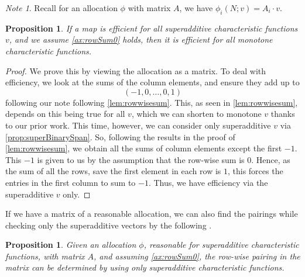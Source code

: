 \documentclass[12pt,letterpaper,final]{article}
\theoremstyle{plain}
\theoremstyle{plain}
\newtheorem{proposition}[theorem]{Proposition}
\theoremstyle{plain}
\theoremstyle{plain}
\theoremstyle{plain}
\theoremstyle{plain}
\theoremstyle{plain}
\theoremstyle{definition}
\theoremstyle{definition}
\theoremstyle{definition}
\theoremstyle{definition}
\theoremstyle{definition}
\theoremstyle{remark}
\theoremstyle{remark}
\newtheorem*{note}{Note}
\theoremstyle{remark}
\theoremstyle{remark}
\begin{document}
\begin{note}
  Recall for an allocation \(\phi\) with matrix \(A\), we have \(\phi_i(N;v)=A_i\cdot v\).
\end{note}

\begin{proposition}\label{prop:eff-superadd-monotone}
  If a map is efficient for all superadditive characteristic functions \(v\), and we
  assume \cref{ax:rowSum0} holds, then it is efficient for all
  monotone characteristic functions.
\end{proposition}

\begin{proof}
  We prove this by viewing the allocation as a matrix. To deal with
  efficiency, we 
  look at the sums of the column elements, and ensure they add up to
  \[
    {\left(
      -1,0,\ldots,0,1
    \right)}
  \]
  following our note following \cref{lem:rowwisesum}.
  This, as seen in \cref{lem:rowwisesum}, depends on this being
  true for all \(v\), which we can shorten to monotone \(v\)  thanks to our
  prior work. This time, however, we can consider only superadditive
  \(v\) via \cref{prop:superBinarySpan}.
  So, following the results in the proof
  of \cref{lem:rowwisesum}, we obtain all the sums of column
  elements except the first \(-1\). This \(-1\) is given to
  us by the assumption that the row-wise sum is 0. Hence, as the sum
  of all the rows, save the first element in each row is \(1\),
  this forces the entries in the first column to sum to \(-1\). Thus, we
  have efficiency via the superadditive \(v\) only.
\end{proof}

If we have a matrix of a reasonable allocation, we can also find the 
pairings while checking only the superadditive vectors by
the following .

\begin{proposition}\label{prop:superaddPairing}
  Given an allocation \(\phi\), reasonable for superadditive
  characteristic functions, with matrix \(A\), and
  assuming \cref{ax:rowSum0}, the row-wise pairing in the matrix can be determined
  by using only superadditive characteristic
  functions.
\end{proposition}
\end{document}
